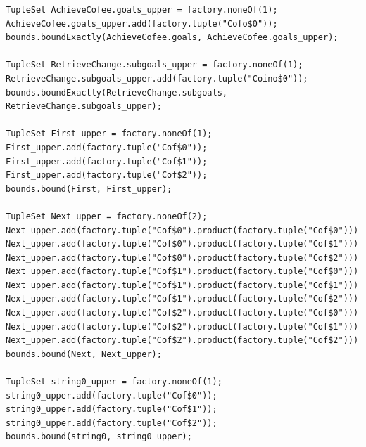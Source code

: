 \documentclass[a4paper,12pt]{report}
\begin{document}
\begin{verbatim}
TupleSet AchieveCofee.goals_upper = factory.noneOf(1);
AchieveCofee.goals_upper.add(factory.tuple("Cofo$0"));
bounds.boundExactly(AchieveCofee.goals, AchieveCofee.goals_upper);

TupleSet RetrieveChange.subgoals_upper = factory.noneOf(1);
RetrieveChange.subgoals_upper.add(factory.tuple("Coino$0"));
bounds.boundExactly(RetrieveChange.subgoals, RetrieveChange.subgoals_upper);

TupleSet First_upper = factory.noneOf(1);
First_upper.add(factory.tuple("Cof$0"));
First_upper.add(factory.tuple("Cof$1"));
First_upper.add(factory.tuple("Cof$2"));
bounds.bound(First, First_upper);

TupleSet Next_upper = factory.noneOf(2);
Next_upper.add(factory.tuple("Cof$0").product(factory.tuple("Cof$0")));
Next_upper.add(factory.tuple("Cof$0").product(factory.tuple("Cof$1")));
Next_upper.add(factory.tuple("Cof$0").product(factory.tuple("Cof$2")));
Next_upper.add(factory.tuple("Cof$1").product(factory.tuple("Cof$0")));
Next_upper.add(factory.tuple("Cof$1").product(factory.tuple("Cof$1")));
Next_upper.add(factory.tuple("Cof$1").product(factory.tuple("Cof$2")));
Next_upper.add(factory.tuple("Cof$2").product(factory.tuple("Cof$0")));
Next_upper.add(factory.tuple("Cof$2").product(factory.tuple("Cof$1")));
Next_upper.add(factory.tuple("Cof$2").product(factory.tuple("Cof$2")));
bounds.bound(Next, Next_upper);

TupleSet string0_upper = factory.noneOf(1);
string0_upper.add(factory.tuple("Cof$0"));
string0_upper.add(factory.tuple("Cof$1"));
string0_upper.add(factory.tuple("Cof$2"));
bounds.bound(string0, string0_upper);



\end{verbatim}
\end{document}
